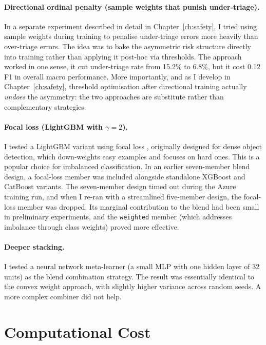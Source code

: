 \paragraph{Directional ordinal penalty (sample weights that punish under-triage).} In a separate experiment described in detail in Chapter~\ref{ch:safety}, I tried using sample weights during training to penalise under-triage errors more heavily than over-triage errors. The idea was to bake the asymmetric risk structure directly into training rather than applying it post-hoc via thresholds. The approach worked in one sense, it cut under-triage rate from 15.2\% to 6.8\%, but it cost 0.12 F1 in overall macro performance. More importantly, and as I develop in Chapter~\ref{ch:safety}, threshold optimisation after directional training actually \emph{undoes} the asymmetry: the two approaches are substitute rather than complementary strategies.

\paragraph{Focal loss (LightGBM with $\gamma = 2$).} I tested a LightGBM variant using focal loss \citep{lin2017focal}, originally designed for dense object detection, which down-weights easy examples and focuses on hard ones. This is a popular choice for imbalanced classification. In an earlier seven-member blend design, a focal-loss member was included alongside standalone XGBoost and CatBoost variants. The seven-member design timed out during the Azure training run, and when I re-ran with a streamlined five-member design, the focal-loss member was dropped. Its marginal contribution to the blend had been small in preliminary experiments, and the \texttt{weighted} member (which addresses imbalance through class weights) proved more effective.

\paragraph{Deeper stacking.} I tested a neural network meta-learner (a small MLP with one hidden layer of 32 units) as the blend combination strategy. The result was essentially identical to the convex weight approach, with slightly higher variance across random seeds. A more complex combiner did not help.

\section{Computational Cost}

